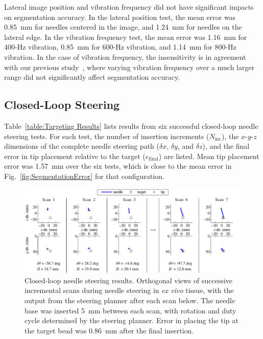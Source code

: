 Lateral image position and vibration frequency did not have significant impacts on segmentation accuracy. In the lateral position test, the mean error was 0.85~mm for needles centered in the image, and 1.24~mm for needles on the lateral edge. In the vibration frequency test, the mean error was 1.16~mm for 400-Hz vibration, 0.85~mm for 600-Hz vibration, and 1.14~mm for 800-Hz vibration. In the case of vibration frequency, the insensitivity is in agreement with our previous study~\cite{Adebar2013}, where varying vibration frequency over a much larger range did not significantly affect segmentation accuracy. 

\subsection{Closed-Loop Steering}
Table~\ref{table:Targeting Results} lists results from six successful closed-loop needle steering tests. For each test, the number of insertion increments ($N_{\text{inc}}$), the $x$-$y$-$z$ dimensions of the complete needle steering path ($\delta x$, $\delta y$, and $\delta z$), and the final error in tip placement relative to the target ($e_{\text{final}}$) are listed. Mean tip placement error was 1.57~mm over the six tests, which is close to the mean error in Fig.~\ref{fig:SegmentationError} for that configuration. 

\begin{figure}[!t]
\centering
\includegraphics[width = \textwidth]{Images/Chapter2/Steering/Steering}%
\caption[Closed-loop needle steering results]{Closed-loop needle steering results. Orthogonal views of successive incremental scans during needle steering in \textit{ex vivo} tissue, with the output from the steering planner after each scan below. The needle base was inserted 5~mm between each scan, with rotation and duty cycle determined by the steering planner. Error in placing the tip at the target bead was 0.86~mm after the final insertion.}
\label{fig:SucessfulSteering}
\end{figure}

